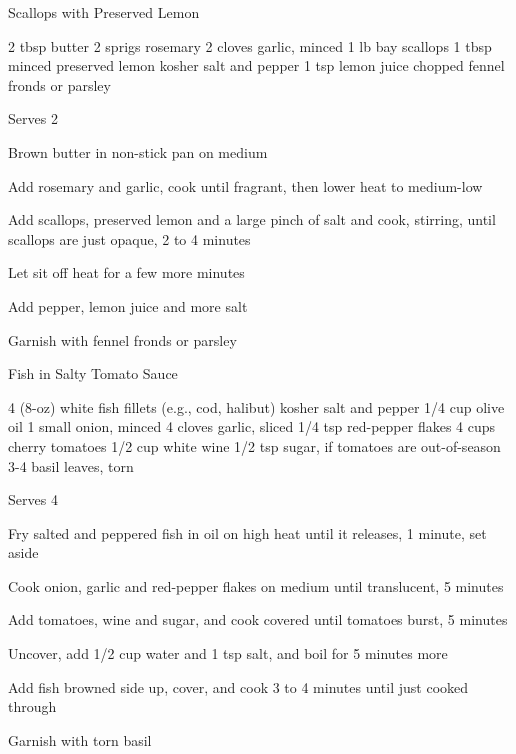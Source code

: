 \begin{recipe}{Scallops with Preserved Lemon}{}
\begin{ingredients}
2 tbsp butter
2 sprigs rosemary
2 cloves garlic, minced
1 lb bay scallops
1 tbsp minced preserved lemon
kosher salt and pepper
1 tsp lemon juice
chopped fennel fronds or parsley
\end{ingredients}
\nextcolumn
Serves 2
\begin{steps}
    \item Brown butter in non-stick pan on medium
    \item Add rosemary and garlic, cook until fragrant, then lower heat to medium-low
    \item Add scallops, preserved lemon and a large pinch of salt and cook, stirring, until scallops are just opaque, 2 to 4 minutes
    \item Let sit off heat for a few more minutes
    \item Add pepper, lemon juice and more salt
    \item Garnish with fennel fronds or parsley
\end{steps}
\end{recipe}

\begin{denserecipe}{Fish in Salty Tomato Sauce}{}
\begin{ingredients}
4 (8-oz) white fish fillets (e.g., cod, halibut)
kosher salt and pepper
1/4 cup olive oil
1 small onion, minced
4 cloves garlic, sliced
1/4 tsp red-pepper flakes
4 cups cherry tomatoes
1/2 cup white wine
1/2 tsp sugar, if tomatoes are out-of-season
3-4 basil leaves, torn
\end{ingredients}
\nextcolumn
Serves 4
\begin{steps}
\item Fry salted and peppered fish in oil on high heat until it releases, 1 minute, set aside
\item Cook onion, garlic and red-pepper flakes on medium until translucent, 5 minutes
\item Add tomatoes, wine and sugar, and cook covered until tomatoes burst, 5 minutes
\item Uncover, add 1/2 cup water and 1 tsp salt, and boil for 5 minutes more
\item Add fish browned side up, cover, and cook 3 to 4 minutes until just cooked through
\item Garnish with torn basil
\end{steps}
\end{denserecipe}

